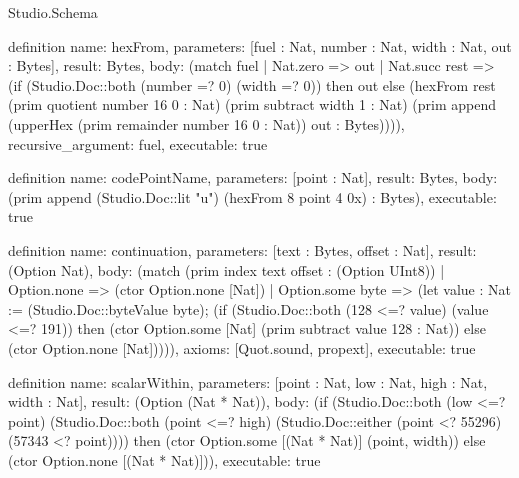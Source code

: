 \begin{lexlean}{Studio.Schema}
\begin{semanticmodule}
definition{
  name: hexFrom,
  parameters: [fuel : Nat, number : Nat, width : Nat, out : Bytes],
  result: Bytes,
  body: (match fuel
    | Nat.zero => out
    | Nat.succ rest => (if (Studio.Doc::both (number =? 0) (width =? 0)) then out else (hexFrom rest (prim quotient number 16 0 : Nat) (prim subtract width 1 : Nat) (prim append (upperHex (prim remainder number 16 0 : Nat)) out : Bytes)))),
  recursive_argument: fuel,
  executable: true
}

definition{
  name: codePointName,
  parameters: [point : Nat],
  result: Bytes,
  body: (prim append (Studio.Doc::lit "u") (hexFrom 8 point 4 0x) : Bytes),
  executable: true
}

definition{
  name: continuation,
  parameters: [text : Bytes, offset : Nat],
  result: (Option Nat),
  body: (match (prim index text offset : (Option UInt8))
    | Option.none => (ctor Option.none [Nat])
    | Option.some byte => (let value : Nat := (Studio.Doc::byteValue byte); (if (Studio.Doc::both (128 <=? value) (value <=? 191)) then (ctor Option.some [Nat] (prim subtract value 128 : Nat)) else (ctor Option.none [Nat])))),
  axioms: [Quot.sound, propext],
  executable: true
}

definition{
  name: scalarWithin,
  parameters: [point : Nat, low : Nat, high : Nat, width : Nat],
  result: (Option (Nat * Nat)),
  body: (if (Studio.Doc::both (low <=? point) (Studio.Doc::both (point <=? high) (Studio.Doc::either (point <? 55296) (57343 <? point)))) then (ctor Option.some [(Nat * Nat)] (point, width)) else (ctor Option.none [(Nat * Nat)])),
  executable: true
}


\end{semanticmodule}
\end{lexlean}
